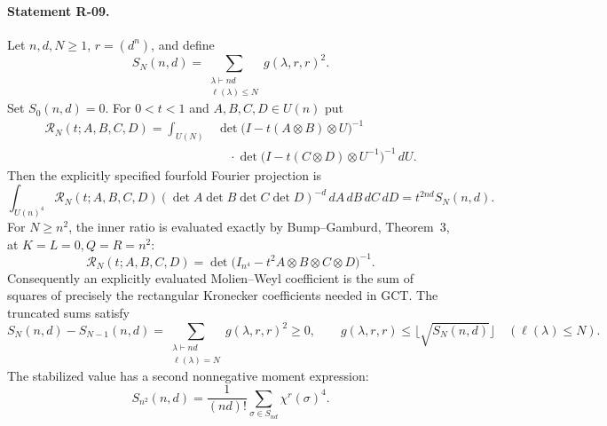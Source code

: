 \documentclass[11pt,a4paper]{article}
\theoremstyle{definition}\newtheorem{definition}{Definition}
\begin{document}
\paragraph{Statement R-09.}
Let $n,d,N\geq1$, $r=(d^n)$, and define
\[
 S_N(n,d)=\sum_{\substack{\lambda\vdash nd\\\ell(\lambda)\leq N}}
                    g(\lambda,r,r)^2.
\]
Set $S_0(n,d)=0$.
For $0<t<1$ and $A,B,C,D\in U(n)$ put
\begin{align*}
 \mathcal R_N(t;A,B,C,D)=\int_{U(N)}
 &\det\bigl(I-t(A\otimes B)\otimes U\bigr)^{-1}\\[-2mm]
 &\quad\cdot
 \det\bigl(I-t(C\otimes D)\otimes U^{-1}\bigr)^{-1}\,dU.
\end{align*}
Then the explicitly specified fourfold Fourier projection is
\begin{equation}\label{R09:squares}
 \int_{U(n)^4}\mathcal R_N(t;A,B,C,D)
   (\det A\det B\det C\det D)^{-d}\,dA\,dB\,dC\,dD
       =t^{2nd}S_N(n,d).
\end{equation}
For $N\geq n^2$, the inner ratio is evaluated exactly by
Bump--Gamburd, Theorem~3, at $K=L=0,Q=R=n^2$:
\begin{equation}\label{R09:evaluated}
 \mathcal R_N(t;A,B,C,D)
       =\det\bigl(I_{n^4}-t^2 A\otimes B\otimes C\otimes D\bigr)^{-1}.
\end{equation}
Consequently an explicitly evaluated Molien--Weyl coefficient is the
sum of squares of precisely the rectangular Kronecker coefficients
needed in GCT. The truncated sums satisfy
\begin{equation}\label{R09:monotone}
 S_N(n,d)-S_{N-1}(n,d)
    =\sum_{\substack{\lambda\vdash nd\\\ell(\lambda)=N}}g(\lambda,r,r)^2
    \geq0,
 \qquad
 g(\lambda,r,r)\leq\lfloor\sqrt{S_N(n,d)}\rfloor
 \quad(\ell(\lambda)\leq N).
\end{equation}
The stabilized value has a second nonnegative moment expression:
\begin{equation}\label{R09:finitefourth}
 S_{n^2}(n,d)=\frac1{(nd)!}\sum_{\sigma\in S_{nd}}\chi^r(\sigma)^4.
\end{equation}
\end{document}

